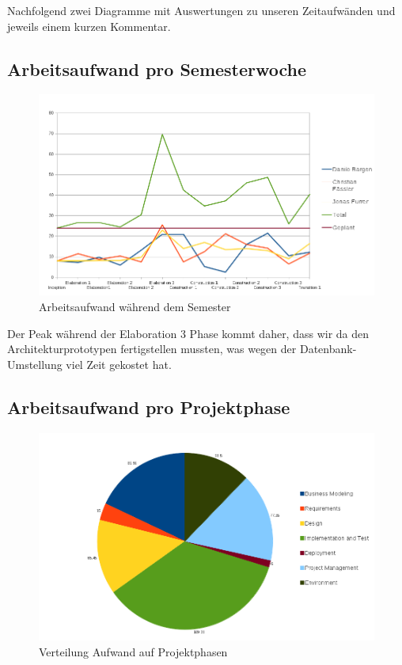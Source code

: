 \documentclass[10pt,a4paper]{scrartcl}
\begin{document}
Nachfolgend zwei Diagramme mit Auswertungen zu unseren Zeitaufwänden und jeweils einem kurzen Kommentar.

\subsection{Arbeitsaufwand pro Semesterwoche}

\begin{figure}[H]
	\begin{center}
		\includegraphics[width=\textwidth]{img/time_diagram.png}
	\end{center}
	\caption{Arbeitsaufwand während dem Semester}
\end{figure}

Der Peak während der Elaboration 3 Phase kommt daher, dass wir da den Architekturprototypen
fertigstellen mussten, was wegen der Datenbank-Umstellung viel Zeit gekostet hat.

\subsection{Arbeitsaufwand pro Projektphase}

\begin{figure}[H]
	\begin{center}
		\includegraphics[width=\textwidth]{img/timelog_tracker.png}
	\end{center}
	\caption{Verteilung Aufwand auf Projektphasen}
\end{figure}
\end{document}
